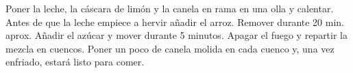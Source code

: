 Poner la leche, la cáscara de limón y la canela en rama en una olla y calentar. Antes de que la leche empiece a hervir añadir el arroz. Remover durante 20 min. aprox. Añadir el azúcar y mover durante 5 minutos. Apagar el fuego y repartir la mezcla en cuencos. Poner un poco de canela molida en cada cuenco y, una vez enfriado, estará listo para comer.
